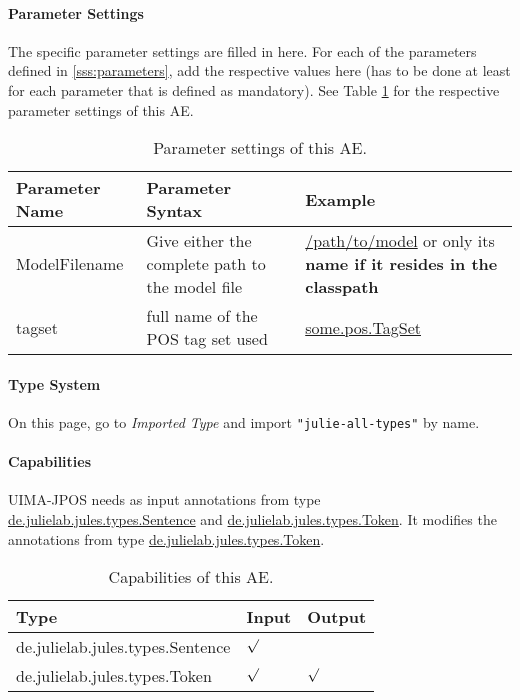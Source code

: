 \documentclass[11pt,a4paper,halfparskip]{scrartcl}
\begin{document}
\paragraph{Parameter Settings}
\label{sss:param_settings}

The specific parameter settings are filled in here. For each of the
parameters defined in \ref{sss:parameters}, add the respective values
here (has to be done at least for each parameter that is defined as
mandatory). See Table \ref{tab:param_settings} for the respective
parameter settings of this AE.

\begin{table}[h!]
  \centering
  \begin{tabular}{|p{4cm}|p{4cm}|p{8cm}|}
    \hline
    Parameter Name & Parameter Syntax & Example \\
    \hline\hline
    ModelFilename & Give either the complete path to the model file
    & \url{/path/to/model} or only its \textbf{name if it resides in the classpath}\\
       \hline
    tagset & full name of the POS tag set used
    & \url{some.pos.TagSet} \\
    \hline\hline
  \end{tabular}
  \caption{Parameter settings of this AE.}
  \label{tab:param_settings}
\end{table}

\paragraph{Type System}
\label{sss:type_system}
On this page, go to \emph{Imported Type} and import \texttt{"julie-all-types"} by name.

\paragraph{Capabilities}
\label{sss:capabilities}
UIMA-JPOS needs as input annotations from type
\url{de.julielab.jules.types.Sentence} and
\url{de.julielab.jules.types.Token}. It modifies the annotations from type
\url{de.julielab.jules.types.Token}. 
\begin{table}[h!]
  \centering
  \begin{tabular}{|p{5cm}|p{2cm}|p{2cm}|}
    \hline
    Type & Input & Output \\
    \hline\hline
     de.julielab.jules.types.Sentence &  $\surd$ & \\
      \hline
     de.julielab.jules.types.Token &  $\surd$ & $\surd$ \\
      \hline
  \end{tabular}
  \caption{Capabilities of this AE.}
  \label{tab:capabilities}
\end{table} 
\end{document}
